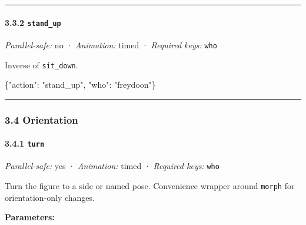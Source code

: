 \documentclass[
  12pt,
  letterpaper,
]{book}
\newenvironment{Shaded}{}{}
\newcommand{\DataTypeTok}[1]{\textcolor[rgb]{0.56,0.13,0.00}{#1}}
\newcommand{\FunctionTok}[1]{\textcolor[rgb]{0.02,0.16,0.49}{#1}}
\newcommand{\StringTok}[1]{\textcolor[rgb]{0.25,0.44,0.63}{#1}}
\begin{document}
\begin{center}\rule{0.5\linewidth}{0.5pt}\end{center}

\paragraph{\texorpdfstring{3.3.2
\texttt{stand\_up}}{3.3.2 stand\_up}}\label{stand_up}

\emph{Parallel-safe:} no · \emph{Animation:} timed · \emph{Required
keys:} \texttt{who}

Inverse of \texttt{sit\_down}.

\begin{Shaded}
\begin{Highlighting}[]
\FunctionTok{\{}\DataTypeTok{"action"}\FunctionTok{:} \StringTok{"stand\_up"}\FunctionTok{,} \DataTypeTok{"who"}\FunctionTok{:} \StringTok{"freydoon"}\FunctionTok{\}}
\end{Highlighting}
\end{Shaded}

\begin{center}\rule{0.5\linewidth}{0.5pt}\end{center}

\subsubsection{3.4 Orientation}\label{orientation}

\paragraph{\texorpdfstring{3.4.1 \texttt{turn}}{3.4.1 turn}}\label{turn}

\emph{Parallel-safe:} yes · \emph{Animation:} timed · \emph{Required
keys:} \texttt{who}

Turn the figure to a side or named pose. Convenience wrapper around
\texttt{morph} for orientation-only changes.

\textbf{Parameters:}
\end{document}
